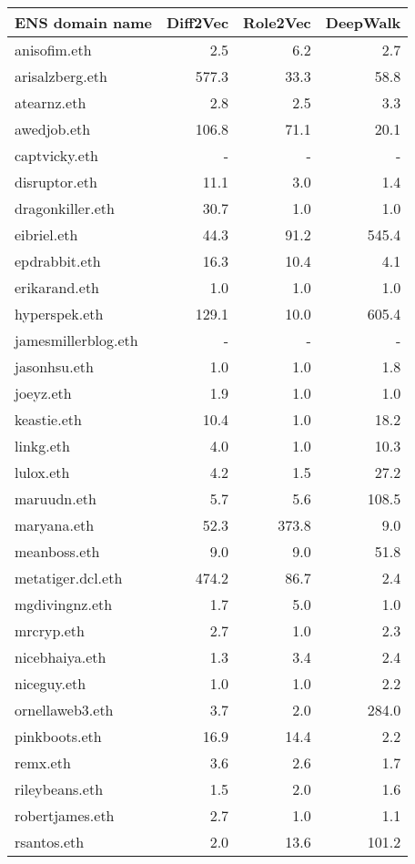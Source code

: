 \documentclass[12pt,a4paper,titlepage,oneside,english]{article}
\begin{document}
\begin{table}[h!]
\scriptsize
  \centering
  \begin{tabular}{lrrr}
    \hline
	\textbf{ENS domain name} & \textbf{Diff2Vec} & \textbf{Role2Vec} & \textbf{DeepWalk} \\
	\hline
	anisofim.eth & 2.5 & 6.2 & 2.7 \\
	arisalzberg.eth & 577.3 & 33.3 & 58.8 \\
	atearnz.eth & 2.8 & 2.5 & 3.3 \\
	awedjob.eth & 106.8 & 71.1 & 20.1 \\
	captvicky.eth & - & - & - \\
	disruptor.eth & 11.1 & 3.0 & 1.4 \\
	dragonkiller.eth & 30.7 & 1.0 & 1.0 \\
	eibriel.eth & 44.3 & 91.2 & 545.4 \\
	epdrabbit.eth & 16.3 & 10.4 & 4.1 \\
	erikarand.eth & 1.0 & 1.0 & 1.0 \\
	hyperspek.eth & 129.1 & 10.0 & 605.4 \\
	jamesmillerblog.eth & - & - & - \\
	jasonhsu.eth & 1.0 & 1.0 & 1.8 \\
	joeyz.eth & 1.9 & 1.0 & 1.0 \\
	keastie.eth & 10.4 & 1.0 & 18.2 \\
	linkg.eth & 4.0 & 1.0 & 10.3 \\
	lulox.eth & 4.2 & 1.5 & 27.2 \\
	maruudn.eth & 5.7 & 5.6 & 108.5 \\
	maryana.eth & 52.3 & 373.8 & 9.0 \\
	meanboss.eth & 9.0 & 9.0 & 51.8 \\
	metatiger.dcl.eth & 474.2 & 86.7 & 2.4 \\
	mgdivingnz.eth & 1.7 & 5.0 & 1.0 \\
	mrcryp.eth & 2.7 & 1.0 & 2.3 \\
	nicebhaiya.eth & 1.3 & 3.4 & 2.4 \\
	niceguy.eth & 1.0 & 1.0 & 2.2 \\
	ornellaweb3.eth & 3.7 & 2.0 & 284.0 \\
	pinkboots.eth & 16.9 & 14.4 & 2.2 \\
	remx.eth & 3.6 & 2.6 & 1.7 \\
	rileybeans.eth & 1.5 & 2.0 & 1.6 \\
	robertjames.eth & 2.7 & 1.0 & 1.1 \\
	rsantos.eth & 2.0 & 13.6 & 101.2 \\

\end{tabular}
\end{table}
\end{document}
